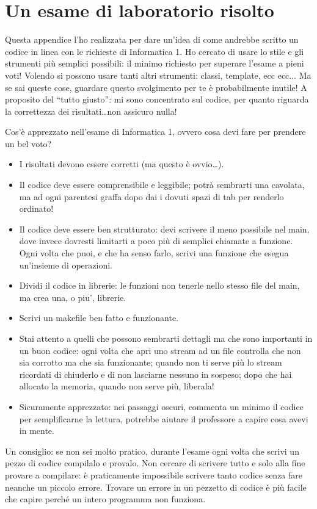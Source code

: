 \chapter{Un esame di laboratorio risolto}
Questa appendice l'ho realizzata per dare un'idea di come andrebbe scritto un codice in linea con le richieste di Informatica 1. Ho cercato di usare lo stile e gli strumenti più semplici possibili: il minimo richiesto per superare l'esame a pieni voti! 
Volendo si possono usare tanti altri strumenti: classi, template, ecc ecc... Ma se sai queste cose, guardare questo svolgimento per te è probabilmente inutile!
A proposito del ``tutto giusto'': mi sono concentrato sul codice, per quanto riguarda la correttezza dei risultati\ldots non assicuro nulla!


Cos'è apprezzato nell'esame di Informatica 1, ovvero cosa devi fare per prendere un bel voto?
\begin{itemize}
\item I risultati devono essere corretti (ma questo è ovvio\ldots).
\item Il codice deve essere comprensibile e leggibile; potrà sembrarti una cavolata, ma ad ogni parentesi graffa dopo dai i dovuti spazi di tab per renderlo ordinato!
\item Il codice deve essere ben strutturato: devi scrivere il meno possibile nel main, dove invece dovresti limitarti a poco più di semplici chiamate a funzione. Ogni volta che puoi, e che ha senso farlo, scrivi una funzione che esegua un'insieme di operazioni.
\item Dividi il codice in librerie: le funzioni non tenerle nello stesso file del main, ma crea una, o piu', librerie. 
\item Scrivi un makefile ben fatto e funzionante.
\item Stai attento a quelli che possono sembrarti dettagli ma che sono importanti in un buon codice: ogni volta che apri uno stream ad un file controlla che non sia corrotto ma che sia funzionante; quando non ti serve più lo stream ricordati di chiuderlo e di non lasciarne nessuno in sospeso; dopo che hai allocato la memoria, quando non serve più, liberala! 
\item Sicuramente apprezzato: nei passaggi oscuri, commenta un minimo il codice per semplificarne la lettura, potrebbe aiutare il professore a capire cosa avevi in mente.
\end{itemize}



Un consiglio: se non sei molto pratico, durante l'esame ogni volta che scrivi un pezzo di codice compilalo e provalo. Non cercare di scrivere tutto e solo alla fine provare a compilare: è praticamente impossibile scrivere tanto codice senza fare neanche un piccolo errore. Trovare un errore in un pezzetto di codice è più facile che capire perché un intero programma non funziona. 

